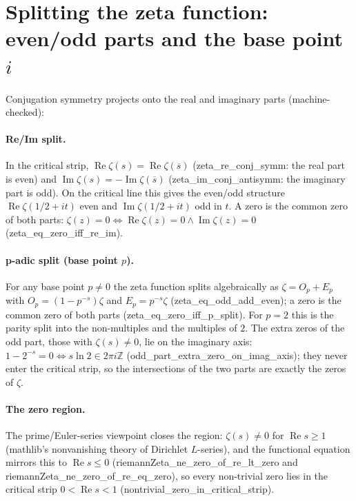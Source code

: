 \documentclass[sigplan,10pt,anonymous,review]{acmart}
\begin{document}
\section{Splitting the zeta function: even/odd parts and the base point $i$}

Conjugation symmetry projects onto the real and imaginary parts
(machine-checked):

\paragraph{Re/Im split.} In the critical strip,
$\operatorname{Re}\zeta(s) = \operatorname{Re}\zeta(\overline{s})$
(zeta\_re\_conj\_symm: the real part is even) and
$\operatorname{Im}\zeta(s) = -\operatorname{Im}\zeta(\overline{s})$
(zeta\_im\_conj\_antisymm: the imaginary part is odd). On the
critical line this gives the even/odd structure
$\operatorname{Re}\zeta(1/2+it)$ even and
$\operatorname{Im}\zeta(1/2+it)$ odd in $t$. A zero is the common
zero of both parts: $\zeta(z) = 0 \iff \operatorname{Re}\zeta(z) = 0
\land \operatorname{Im}\zeta(z) = 0$ (zeta\_eq\_zero\_iff\_re\_im).

\paragraph{p-adic split (base point $p$).} For any base point
$p \neq 0$ the zeta function splits algebraically as
$\zeta = O_p + E_p$ with $O_p = (1-p^{-s})\zeta$ and
$E_p = p^{-s}\zeta$ (zeta\_eq\_odd\_add\_even); a zero is the common
zero of both parts (zeta\_eq\_zero\_iff\_p\_split). For $p = 2$ this
is the parity split into the non-multiples and the multiples of $2$.
The extra zeros of the odd part, those with $\zeta(s) \neq 0$, lie on
the imaginary axis: $1-2^{-s} = 0 \iff s\ln 2 \in 2\pi i\mathbb{Z}$
(odd\_part\_extra\_zero\_on\_imag\_axis); they never enter the
critical strip, so the intersections of the two parts are exactly the
zeros of $\zeta$.

\paragraph{The zero region.} The prime/Euler-series viewpoint closes
the region: $\zeta(s) \neq 0$ for $\operatorname{Re}s \geq 1$
(mathlib's nonvanishing theory of Dirichlet $L$-series), and the
functional equation mirrors this to $\operatorname{Re}s \leq 0$
(riemannZeta\_ne\_zero\_of\_re\_lt\_zero and
riemannZeta\_ne\_zero\_of\_re\_eq\_zero), so every non-trivial zero
lies in the critical strip $0 < \operatorname{Re}s < 1$
(nontrivial\_zero\_in\_critical\_strip).
\end{document}
